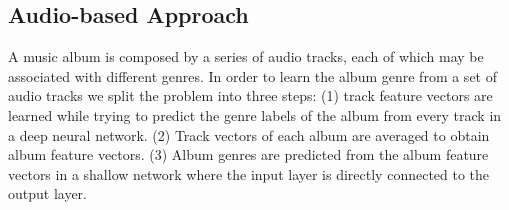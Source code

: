 




\subsection{Audio-based Approach}\label{sec:multi-class:audio}

A music album is composed by a series of audio tracks, each of which may be associated with different genres. %
In order to learn the album genre from a set of audio tracks we split the problem into three steps: (1) track feature vectors are learned while trying to predict the genre labels of the album from every track in a deep neural network. (2) Track vectors of each album are averaged to obtain album feature vectors.
(3) Album genres are predicted from the album feature vectors in a shallow network where the input layer is directly connected to the output layer.

